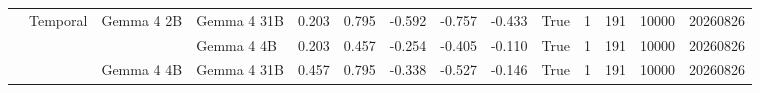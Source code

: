 \begin{table}
\begin{tabular}{llllrrrrrrrrrr}
\cline{2-14} \cline{3-14}
 & \multirow[t]{3}{*}{Temporal} & \multirow[t]{2}{*}{Gemma 4 2B} & Gemma 4 31B & 0.203 & 0.795 & -0.592 & -0.757 & -0.433 & True & 1 & 191 & 10000 & 20260826 \\
 &  &  & Gemma 4 4B & 0.203 & 0.457 & -0.254 & -0.405 & -0.110 & True & 1 & 191 & 10000 & 20260826 \\
\cline{3-14}
 &  & Gemma 4 4B & Gemma 4 31B & 0.457 & 0.795 & -0.338 & -0.527 & -0.146 & True & 1 & 191 & 10000 & 20260826 \\
\cline{1-14} \cline{2-14} \cline{3-14}
\bottomrule
\end{tabular}
\end{table}
